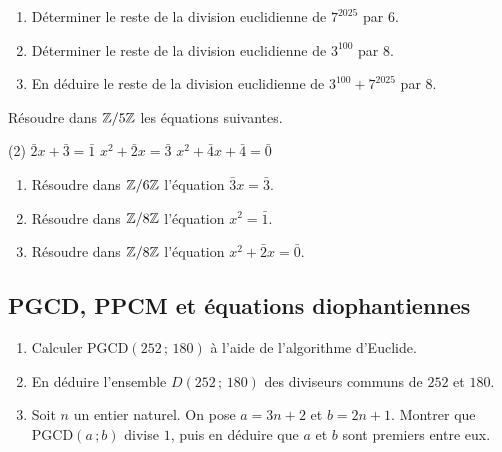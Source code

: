 \begin{enumerate}
	\item Déterminer le reste de la division euclidienne de $7^{2025}$ par $6$.

	\item Déterminer le reste de la division euclidienne de $3^{100}$ par $8$.

	\item En déduire le reste de la division euclidienne de $3^{100} + 7^{2025}$ par $8$.
\end{enumerate}



Résoudre dans $\mathbb{Z}/5\mathbb{Z}$ les équations suivantes.

\begin{listecol}(2)
	\task $\bar{2}x + \bar{3} = \bar{1}$
	\task $x^2 + \bar{2}x = \bar{3}$
	\task $x^2 + \bar{4}x + \bar{4} = \bar{0}$
\end{listecol}



\begin{enumerate}
	\item Résoudre dans $\mathbb{Z}/6\mathbb{Z}$ l'équation $\bar{3}x = \bar{3}$.

	\item Résoudre dans $\mathbb{Z}/8\mathbb{Z}$ l'équation $x^2 = \bar{1}$.

	\item Résoudre dans $\mathbb{Z}/8\mathbb{Z}$ l'équation $x^2 + \bar{2}x = \bar{0}$.
\end{enumerate}


\subsection{PGCD, PPCM et équations diophantiennes}


\begin{enumerate}
	\item Calculer $\mathrm{PGCD}(252\,;\,180)$ à l'aide de l'algorithme d'Euclide.

	\item En déduire l'ensemble $D(252\,;\,180)$ des diviseurs communs de $252$ et $180$.

	\item Soit $n$ un entier naturel. On pose $a = 3n + 2$ et $b = 2n + 1$.
	Montrer que $\mathrm{PGCD}(a\,;b)$ divise $1$, puis en déduire que $a$ et $b$
	sont premiers entre eux.
\end{enumerate}



